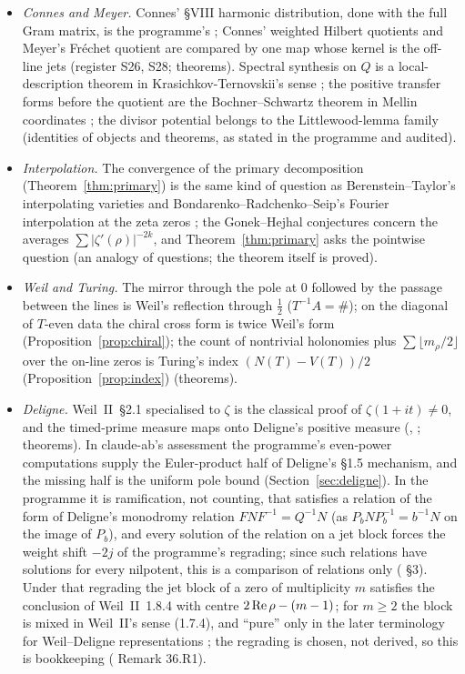 \begin{itemize}
\item \emph{Connes and Meyer.} Connes' §VIII harmonic distribution, done with the full Gram matrix, is the programme's ; Connes' weighted Hilbert quotients \cite{Connes} and Meyer's Fréchet quotient \cite{Meyer} are compared by one map whose kernel is the off-line jets (register S26, S28; theorems). Spectral synthesis on $Q$ is a local-description theorem in Krasichkov-Ternovskii's sense \cite{Krasichkov}; the positive transfer forms before the quotient are the Bochner--Schwartz theorem in Mellin coordinates \cite{Vladimirov}; the divisor potential belongs to the Littlewood-lemma family \cite{BalazardSaiasYor,SekatskiiBeltraminelliMerlini} (identities of objects and theorems, as stated in the programme and audited).
\item \emph{Interpolation.} The convergence of the primary decomposition (Theorem~\ref{thm:primary}) is the same kind of question as Berenstein--Taylor's interpolating varieties \cite{BerensteinTaylor} and Bondarenko--Radchenko--Seip's Fourier interpolation at the zeta zeros \cite{BondarenkoRadchenkoSeip}; the Gonek--Hejhal conjectures concern the averages $\sum|\zeta'(\rho)|^{-2k}$, and Theorem~\ref{thm:primary} asks the pointwise question (an analogy of questions; the theorem itself is proved).
\item \emph{Weil and Turing.} The mirror through the pole at $0$ followed by the passage between the lines is Weil's reflection through $\tfrac12$ ($T^{-1}A=\#$); on the diagonal of $T$-even data the chiral cross form is twice Weil's form (Proposition~\ref{prop:chiral}); the count of nontrivial holonomies plus $\sum\lfloor m_\rho/2\rfloor$ over the on-line zeros is Turing's index $(N(T)-V(T))/2$ (Proposition~\ref{prop:index}) (theorems).
\item \emph{Deligne.} Weil~II~§2.1 specialised to $\zeta$ is the classical proof of $\zeta(1+it)\ne0$, and the timed-prime measure maps onto Deligne's positive measure (, ; theorems). In claude-ab's assessment the programme's even-power computations supply the Euler-product half of Deligne's §1.5 mechanism, and the missing half is the uniform pole bound (Section~\ref{sec:deligne}). In the programme it is ramification, not counting, that satisfies a relation of the form of Deligne's monodromy relation $FNF^{-1}=Q^{-1}N$ (as $P_bNP_b^{-1}=b^{-1}N$ on the image of $P_b$), and every solution of the relation on a jet block forces the weight shift $-2j$ of the programme's regrading; since such relations have solutions for every nilpotent, this is a comparison of relations only ( §3). Under that regrading the jet block of a zero of multiplicity $m$ satisfies the conclusion of Weil~II~1.8.4 with centre $2\operatorname{Re}\rho-(m-1)$; for $m\ge2$ the block is mixed in Weil~II's sense (1.7.4), and ``pure'' only in the later terminology for Weil--Deligne representations \cite{TaylorYoshida}; the regrading is chosen, not derived, so this is bookkeeping ( Remark 36.R1).

\end{itemize}
